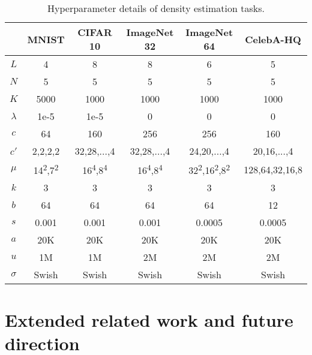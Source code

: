 \documentclass{article}
\begin{document}
\begin{table*}[ht]
\centering
\begin{tabular}{cccccc} 
\toprule
{\bf } & {\bf MNIST} & {\bf CIFAR 10} & {\bf ImageNet 32} & {\bf ImageNet 64} & {\bf CelebA-HQ} \\ 
\midrule
$L$ & 4 & 8 & 8 & 6 & 5\\
$N$ & 5 & 5 & 5 & 5 & 5\\
$K$ & 5000 & 1000 & 1000 & 1000 & 1000\\
$\lambda$ & 1e-5 & 1e-5 & 0 & 0 & 0\\
$c$ & 64 & 160 & 256 & 256 & 160\\
$c'$ & 2,2,2,2 & 32,28,...,4 & 32,28,...,4 & 24,20,...,4 & 20,16,...,4\\
$\mu$ & 14\textsuperscript{2},7\textsuperscript{2} & 16\textsuperscript{4},8\textsuperscript{4} & 16\textsuperscript{4},8\textsuperscript{4} & 32\textsuperscript{2},16\textsuperscript{2},8\textsuperscript{2} & 128,64,32,16,8 \\
$k$ & 3 & 3 & 3 & 3 & 3\\
$b$ & 64 & 64 & 64 & 64 & 12\\
$s$ & 0.001 & 0.001 & 0.001 & 0.0005 & 0.0005\\
$a$ & 20K & 20K & 20K & 20K & 20K\\
$u$ & 1M & 1M & 2M & 2M & 2M\\
$\sigma$ & Swish & Swish & Swish & Swish & Swish\\
\bottomrule
\end{tabular}
\caption{Hyperparameter details of density estimation tasks.}
\label{tab:exp_details}
\end{table*}





\clearpage

\section{Extended related work and future direction}
\label{app:related}
\end{document}
